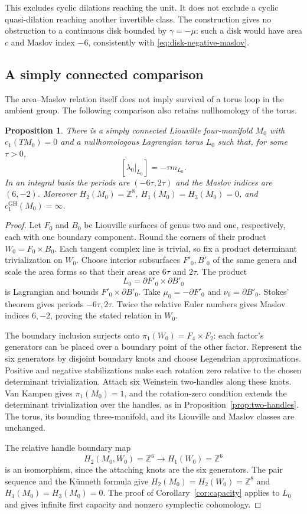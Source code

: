 \documentclass[11pt]{amsart}
\newtheorem{proposition}[theorem]{Proposition}
\theoremstyle{definition}
\theoremstyle{remark}
\newcommand{\Z}{\mathbb Z}
\begin{document}
This excludes cyclic dilations reaching the unit. It does not
exclude a cyclic quasi-dilation reaching another invertible class.
The construction gives no obstruction to a continuous disk bounded
by $\gamma=-\mu$: such a disk would have area $c$ and Maslov
index $-6$, consistently with \eqref{eq:disk-negative-maslov}.

\subsection{A simply connected comparison}

The area--Maslov relation itself does not imply survival of a torus
loop in the ambient group. The following comparison also retains
nullhomology of the torus.

\begin{proposition}\label{prop:simply-connected-torus}
There is a simply connected Liouville four-manifold $M_0$ with
$c_1(TM_0)=0$ and a nullhomologous Lagrangian torus $L_0$ such that,
for some $\tau>0$,
\[
                 [\lambda_0|_{L_0}]=-\tau m_{L_0}.
\]
In an integral basis the periods are $(-6\tau,2\tau)$ and
the Maslov indices are $(6,-2)$. Moreover $H_2(M_0)=\Z^8$,
$H_1(M_0)=H_3(M_0)=0$, and $c_1^{\mathrm{GH}}(M_0)=\infty$.
\end{proposition}
\begin{proof}
Let $F_0$ and $B_0$ be Liouville surfaces of genus two and one,
respectively, each with one boundary component. Round the corners
of their product $W_0=F_0\times B_0$. Each tangent complex line
is trivial, so fix a product determinant trivialization on $W_0$.
Choose interior subsurfaces $F'_0,B'_0$ of the same genera and
scale the area forms so that their areas are $6\tau$ and $2\tau$.
The product
\[
                     L_0=\partial F'_0\times\partial B'_0
\]
is Lagrangian and bounds $F'_0\times\partial B'_0$.
Take $\mu_0=-\partial F'_0$ and $\nu_0=\partial B'_0$.
Stokes' theorem gives periods $-6\tau,2\tau$. Twice the relative
Euler numbers gives Maslov indices $6,-2$, proving the stated
relation in $W_0$.

The boundary inclusion surjects onto
$\pi_1(W_0)=F_4\times F_2$: each factor's generators can be
placed over a boundary point of the other factor. Represent the
six generators by disjoint boundary knots and choose Legendrian
approximations. Positive and negative stabilizations make each
rotation zero relative to the chosen determinant trivialization.
Attach six Weinstein two-handles along these knots. Van Kampen
gives $\pi_1(M_0)=1$, and the rotation-zero condition extends
the determinant trivialization over the handles, as in
Proposition~\ref{prop:two-handles}. The torus, its bounding
three-manifold, and its Liouville and Maslov classes are unchanged.

The relative handle boundary map
\[
 H_2(M_0,W_0)=\Z^6\longrightarrow H_1(W_0)=\Z^6
\]
is an isomorphism, since the attaching knots are the six generators.
The pair sequence and the K\"unneth formula give
$H_2(M_0)=H_2(W_0)=\Z^8$ and $H_1(M_0)=H_3(M_0)=0$.
The proof of Corollary~\ref{cor:capacity} applies to $L_0$ and
gives infinite first capacity and nonzero symplectic cohomology.
\end{proof}
\end{document}
